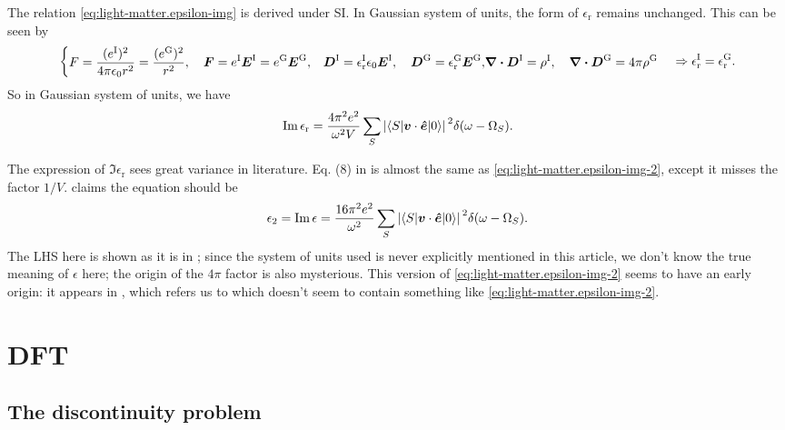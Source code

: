 \documentclass[hyperref, a4paper, 12pt]{report}
\def\\{}%
\newcommand*{\epsr}{\epsilon_{\text{r}}}
\begin{document}
The relation \eqref{eq:light-matter.epsilon-img} is derived under SI. 
In Gaussian system of units, 
the form of $\epsr$ remains unchanged. 
This can be seen by 
\[
    \left\{
        \begin{aligned}
            &F = \frac{(e^{\text{I}})^2}{4 \pi \epsilon_0 r^2} = \frac{(e^{\text{G}})^2}{r^2}, \quad 
            \vb*{F} = e^{\text{I}} \vb*{E}^{\text{I}} 
            = e^{\text{G}} \vb*{E}^{\text{G}}, \\
            &\vb*{D}^{\text{I}} = \epsr^{\text{I}} \epsilon_0 \vb*{E}^{\text{I}}, \quad 
            \vb*{D}^{\text{G}} = \epsr^{\text{G}} \vb*{E}^{\text{G}}, \\
            &\div{\vb*{D}}^{\text{I}} = \rho^{\text{I}}, \quad 
            \div{\vb*{D}}^{\text{G}} = 4\pi \rho^{\text{G}}
        \end{aligned}
    \right. \Rightarrow
    \epsr^{\text{I}} = \epsr^{\text{G}}.
\]
So in Gaussian system of units, 
we have 
\begin{equation}
    \Im \epsr = \frac{4 \pi^2 e^2}{\omega^2  V} 
        \sum_S \abs*{\mel**{S}{\vb*{v} \cdot \vu*{e}}{0}}^2 \delta(\omega - \Omega_S).
    \label{eq:light-matter.epsilon-img-2}
\end{equation}

The expression of $\Im \epsr$ sees great variance in literature. 
Eq. (8) in \cite{del1993optical} is almost the same as \eqref{eq:light-matter.epsilon-img-2},
except it misses the factor $1 / V$. 
\cite{berkeleygw} claims the equation should be 
\[
    \epsilon_2 = \Im \epsilon = \frac{16 \pi^2 e^2}{\omega^2 } 
    \sum_S \abs*{\mel**{S}{\vb*{v} \cdot \vu*{e}}{0}}^2 \delta(\omega - \Omega_S).
\]
The LHS here is shown as it is in \cite{berkeleygw}; 
since the system of units used is never explicitly mentioned in this article, 
we don't know the true meaning of $\epsilon$ here;
the origin of the $4\pi$ factor is also mysterious.
This version of \eqref{eq:light-matter.epsilon-img-2} seems to have an early origin:
it appears in \cite{rohlfing2000electron},
which refers us to \cite{adolph1996nonlocality}
which doesn't seem to contain something like \eqref{eq:light-matter.epsilon-img-2}.

\chapter{DFT}

\section{The discontinuity problem}
\end{document}
